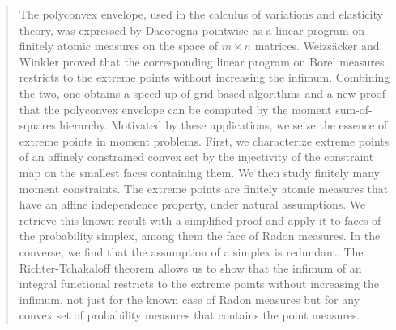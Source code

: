 \documentclass[a4paper,11pt,reqno]{amsart}
\numberwithin{equation}{section}
\theoremstyle{plain}
\theoremstyle{definition}
\begin{document}
\begin{abstract}
The polyconvex envelope, used in the calculus of variations and elasticity theory, was 
expressed by Dacorogna pointwise as a linear program on finitely atomic measures on the 
space of $m\times n$ matrices. Weizs\"acker and Winkler proved that the corresponding 
linear program on Borel measures restricts to the extreme points without increasing the 
infimum. Combining the two, one obtains a speed-up of grid-based algorithms and a new 
proof that the polyconvex envelope can be computed by the moment sum-of-squares 
hierarchy. Motivated by these applications, we seize the essence of extreme points in 
moment problems. First, we characterize extreme points of an affinely constrained convex 
set by the injectivity of the constraint map on the smallest faces containing them. We 
then study finitely many moment constraints. The extreme points are finitely atomic 
measures that have an affine independence property, under natural assumptions. We 
retrieve this known result with a simplified proof and apply it to faces of the probability 
simplex, among them the face of Radon measures. In the converse, we find that the 
assumption of a simplex is redundant. The Richter-Tchakaloff theorem allows us to show 
that the infimum of an integral functional restricts to the extreme points without 
increasing the infimum, not just for the known case of Radon measures but for any convex 
set of probability measures that contains the point measures.
\end{abstract}
%
\maketitle
%
%
%
\end{document}
